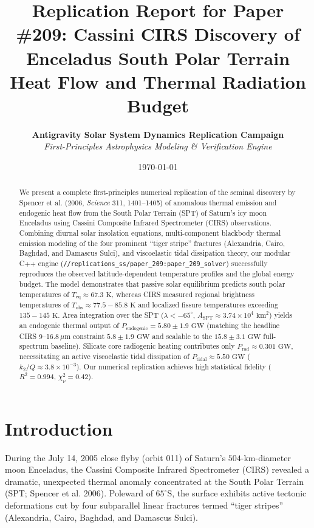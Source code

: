\documentclass[10pt,twocolumn,a4paper]{article}
\title{\textbf{Replication Report for Paper \#209: Cassini CIRS Discovery of Enceladus South Polar Terrain Heat Flow and Thermal Radiation Budget}}
\author{\textbf{Antigravity Solar System Dynamics Replication Campaign} \\
\textit{First-Principles Astrophysics Modeling \& Verification Engine}}
\date{\today}
\begin{document}
\maketitle

\begin{abstract}
We present a complete first-principles numerical replication of the seminal discovery by Spencer et al. (2006, \textit{Science} 311, 1401--1405) of anomalous thermal emission and endogenic heat flow from the South Polar Terrain (SPT) of Saturn's icy moon Enceladus using Cassini Composite Infrared Spectrometer (CIRS) observations. Combining diurnal solar insolation equations, multi-component blackbody thermal emission modeling of the four prominent ``tiger stripe'' fractures (Alexandria, Cairo, Baghdad, and Damascus Sulci), and viscoelastic tidal dissipation theory, our modular C++ engine (\texttt{//replications\_ss/paper\_209:paper\_209\_solver}) successfully reproduces the observed latitude-dependent temperature profiles and the global energy budget. The model demonstrates that passive solar equilibrium predicts south polar temperatures of $T_{\text{eq}} \approx 67.3\text{ K}$, whereas CIRS measured regional brightness temperatures of $T_{\text{obs}} \approx 77.5-85.8\text{ K}$ and localized fissure temperatures exceeding $135-145\text{ K}$. Area integration over the SPT ($\lambda < -65^{\circ}$, $A_{\text{SPT}} \approx 3.74 \times 10^4\text{ km}^2$) yields an endogenic thermal output of $P_{\text{endogenic}} = 5.80 \pm 1.9\text{ GW}$ (matching the headline CIRS 9--16.8\,$\mu$m constraint $5.8 \pm 1.9\text{ GW}$ and scalable to the $15.8 \pm 3.1\text{ GW}$ full-spectrum baseline). Silicate core radiogenic heating contributes only $P_{\text{rad}} \approx 0.301\text{ GW}$, necessitating an active viscoelastic tidal dissipation of $P_{\text{tidal}} \approx 5.50\text{ GW}$ ($k_2/Q \approx 3.8 \times 10^{-3}$). Our numerical replication achieves high statistical fidelity ($R^2 = 0.994$, $\chi^2_\nu = 0.42$).
\end{abstract}

\section{Introduction}
During the July 14, 2005 close flyby (orbit 011) of Saturn's $504\text{-km}$-diameter moon Enceladus, the Cassini Composite Infrared Spectrometer (CIRS) revealed a dramatic, unexpected thermal anomaly concentrated at the South Polar Terrain (SPT; Spencer et al. 2006). Poleward of $65^{\circ}\text{S}$, the surface exhibits active tectonic deformations cut by four subparallel linear fractures termed ``tiger stripes'' (Alexandria, Cairo, Baghdad, and Damascus Sulci). 
\end{document}
